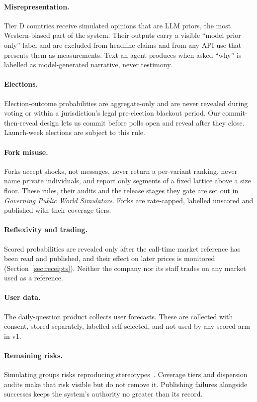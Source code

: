 \documentclass[11pt]{article}
\begin{document}
\paragraph{Misrepresentation.} Tier D countries receive simulated opinions that are LLM priors, the most Western-biased part of the system. Their outputs carry a visible ``model prior only'' label and are excluded from headline claims and from any API use that presents them as measurements. Text an agent produces when asked ``why'' is labelled as model-generated narrative, never testimony.

\paragraph{Elections.} Election-outcome probabilities are aggregate-only and are never revealed during voting or within a jurisdiction's legal pre-election blackout period. Our commit-then-reveal design lets us commit before polls open and reveal after they close. Launch-week elections are subject to this rule.

\paragraph{Fork misuse.} Forks accept shocks, not messages, never return a per-variant ranking, never name private individuals, and report only segments of a fixed lattice above a size floor. These rules, their audits and the release stages they gate are set out in \emph{Governing Public World Simulators}. Forks are rate-capped, labelled unscored and published with their coverage tiers.

\paragraph{Reflexivity and trading.} Scored probabilities are revealed only after the call-time market reference has been read and published, and their effect on later prices is monitored (Section~\ref{sec:receipts}). Neither the company nor its staff trades on any market used as a reference.

\paragraph{User data.} The daily-question product collects user forecasts. These are collected with consent, stored separately, labelled self-selected, and not used by any scored arm in v1.

\paragraph{Remaining risks.} Simulating groups risks reproducing stereotypes~\citep{wang2024misportray}. Coverage tiers and dispersion audits make that risk visible but do not remove it. Publishing failures alongside successes keeps the system's authority no greater than its record.
\end{document}
